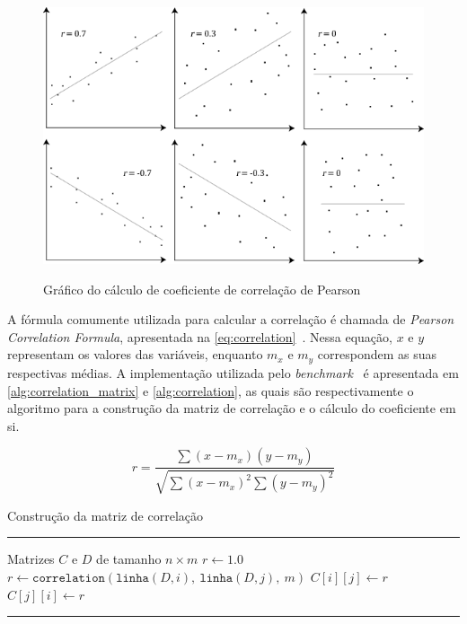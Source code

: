 \begin{figure}[htb]
	\caption{Gráfico do cálculo de coeficiente de correlação de Pearson}
	\centering
	\includegraphics[scale=0.7]{figuras/correlation.png}
	\label{fig:correlation}
\end{figure}

A fórmula comumente utilizada para calcular a correlação é chamada de \textit{Pearson Correlation Formula}, apresentada na \autoref{eq:correlation}~\cite{morettin2010}. Nessa equação, $x$ e $y$ representam os valores das variáveis, enquanto $m_x$ e $m_y$ correspondem as suas respectivas médias. A implementação utilizada pelo \textit{benchmark}~\cite{polybench} é apresentada em \autoref{alg:correlation_matrix} e \autoref{alg:correlation}, as quais são respectivamente o algoritmo para a construção da matriz de correlação e o cálculo do coeficiente em si.

\begin{equation}
	\label{eq:correlation}
	r = \frac{\sum(x - m_x)(y - m_y)}{\sqrt{\sum(x-m_x)^2 \sum(y - m_y)^2}}
\end{equation}

\begin{algorithm}[htb]
	\caption{Construção da matriz de correlação}
	\label{alg:correlation_matrix}
	\hrule
	\begin{algorithmic}[1]
		\REQUIRE Matrizes $C$ e $D$ de tamanho $n \times m$
		\STATE $r \gets 1.0$
		\ELSE
		\STATE $r \gets \texttt{correlation}(\texttt{linha}(D, i),\ \texttt{linha}(D, j),\ m)$
		\ENDIF
		\STATE $C[i][j] \gets r$
		\STATE $C[j][i] \gets r$
		\ENDFOR
		\ENDFOR
	\end{algorithmic}
	\hrule
	\fonte{}
\end{algorithm}


